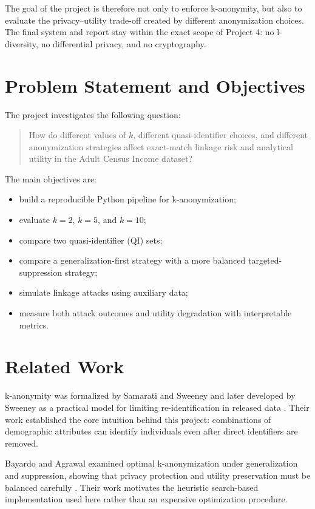 \documentclass[11pt]{article}
\begin{document}
The goal of the project is therefore not only to enforce k-anonymity, but also to evaluate the privacy--utility trade-off created by different anonymization choices. The final system and report stay within the exact scope of Project 4: no l-diversity, no differential privacy, and no cryptography.

\section{Problem Statement and Objectives}
The project investigates the following question:

\begin{quote}
How do different values of $k$, different quasi-identifier choices, and different anonymization strategies affect exact-match linkage risk and analytical utility in the Adult Census Income dataset?
\end{quote}

The main objectives are:
\begin{itemize}[leftmargin=*]
    \item build a reproducible Python pipeline for k-anonymization;
    \item evaluate $k=2$, $k=5$, and $k=10$;
    \item compare two quasi-identifier (QI) sets;
    \item compare a generalization-first strategy with a more balanced targeted-suppression strategy;
    \item simulate linkage attacks using auxiliary data;
    \item measure both attack outcomes and utility degradation with interpretable metrics.
\end{itemize}

\section{Related Work}
k-anonymity was formalized by Samarati and Sweeney and later developed by Sweeney as a practical model for limiting re-identification in released data \cite{SamaratiSweeney1998,Sweeney2002}. Their work established the core intuition behind this project: combinations of demographic attributes can identify individuals even after direct identifiers are removed.

Bayardo and Agrawal examined optimal k-anonymization under generalization and suppression, showing that privacy protection and utility preservation must be balanced carefully \cite{BayardoAgrawal2005}. Their work motivates the heuristic search-based implementation used here rather than an expensive optimization procedure.
\end{document}
